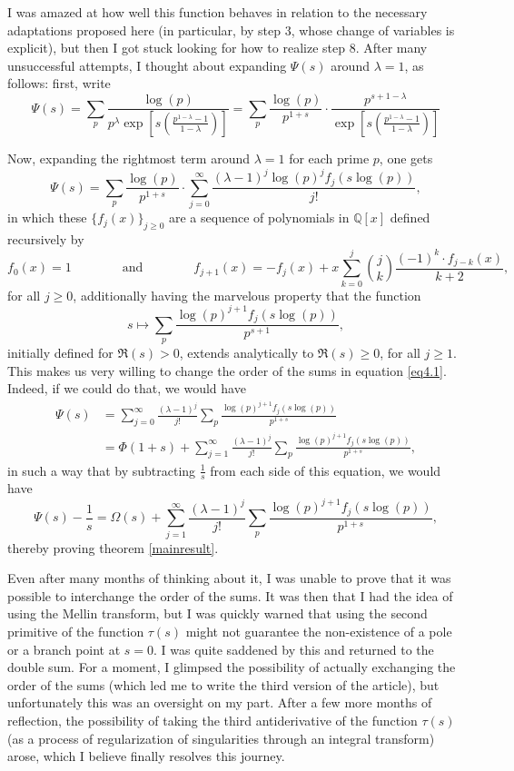 \documentclass[11pt]{amsart}
\numberwithin{equation}{section}
\newcommand{\disum}{\displaystyle \sum}
\newcommand{\difrac}{\displaystyle \frac}
\newcommand{\dibinom}{\displaystyle \binom}
\begin{document}
I was amazed at how well this function behaves in relation to the necessary adaptations proposed here (in particular, by step 3, whose change of variables is explicit), but then I got stuck looking for how to realize step 8. After many unsuccessful attempts, I thought about expanding $\Psi(s)$ around $\lambda = 1$, as follows: first, write $$\Psi(s) = \disum_p \difrac{\log(p)}{p^\lambda \exp\left[s\left(\difrac{p^{1 - \lambda} - 1}{1 - \lambda}\right)\right]} = \disum_p \difrac{\log(p)}{p^{1+s}} \cdot \difrac{p^{s + 1 - \lambda}}{\exp\left[s\left(\difrac{p^{1 - \lambda} - 1}{1 - \lambda}\right)\right]}$$

Now, expanding the rightmost term around $\lambda = 1$ for each prime $p$, one gets \begin{equation} \label{eq4.1} \Psi(s) = \disum_p \difrac{\log(p)}{p^{1 + s}} \cdot \disum_{j = 0}^{\infty} \difrac{(\lambda - 1)^j \log(p)^j f_j(s\log(p))}{j!},\end{equation} in which these $\{f_j(x)\}_{j \geq 0}$ are a sequence of polynomials in $\mathbb{Q}[x]$ defined recursively by $$f_0(x) = 1 \qquad \qquad \text{and} \qquad \qquad f_{j+1}(x) = -f_j(x) + x\disum_{k = 0}^{j} \dibinom{j}{k} \difrac{(-1)^k \cdot f_{j-k}(x)}{k+2},$$ for all $j \geq 0$, additionally having the marvelous property that the function $$s \mapsto \disum_p \difrac{\log(p)^{j + 1} f_j(s\log(p))}{p^{s + 1}},$$ initially defined for $\Re(s) > 0$, extends analytically to $\Re(s) \geq 0$, for all $j \geq 1$. This makes us very willing to change the order of the sums in equation \ref{eq4.1}. Indeed, if we could do that, we would have \begin{equation*} \begin{split} \Psi(s) & = \disum_{j = 0}^{\infty} \difrac{(\lambda - 1)^j}{j!} \disum_p \difrac{\log(p)^{j + 1} f_j(s\log(p))}{p^{1 + s}} \\ & = \Phi(1+s) + \disum_{j = 1}^{\infty} \difrac{(\lambda - 1)^j}{j!} \disum_p \difrac{\log(p)^{j + 1} f_j(s\log(p))}{p^{1 + s}}, \end{split} \end{equation*} in such a way that by subtracting $\difrac{1}{s}$ from each side of this equation, we would have $$\Psi(s) - \difrac{1}{s} = \Omega(s) + \disum_{j = 1}^{\infty} \difrac{(\lambda - 1)^j}{j!} \disum_p \difrac{\log(p)^{j + 1} f_j(s\log(p))}{p^{1 + s}},$$ thereby proving theorem \ref{mainresult}.

Even after many months of thinking about it, I was unable to prove that it was possible to interchange the order of the sums. It was then that I had the idea of using the Mellin transform, but I was quickly warned that using the second primitive of the function $\tau(s)$ might not guarantee the non-existence of a pole or a branch point at $s = 0$. I was quite saddened by this and returned to the double sum. For a moment, I glimpsed the possibility of actually exchanging the order of the sums (which led me to write the third version of the article), but unfortunately this was an oversight on my part. After a few more months of reflection, the possibility of taking the third antiderivative of the function $\tau(s)$ (as a process of regularization of singularities through an integral transform) arose, which I believe finally resolves this journey.
\end{document}
